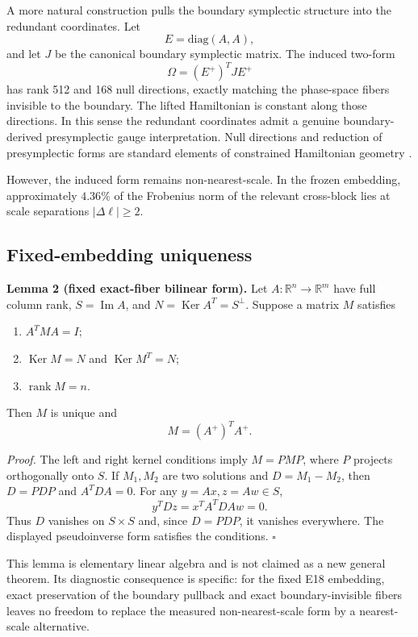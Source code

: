 \documentclass[11pt,a4paper]{article}
\newcommand{\R}{\mathbb{R}}
\newcommand{\rank}{\operatorname{rank}}
\newcommand{\Img}{\operatorname{Im}}
\newcommand{\Ker}{\operatorname{Ker}}
\begin{document}
A more natural construction pulls the boundary symplectic structure into the redundant coordinates. Let
\begin{equation}
E=\mathrm{diag}(A,A),
\end{equation}
and let $J$ be the canonical boundary symplectic matrix. The induced two-form
\begin{equation}
\Omega=(E^+)^T J E^+
\end{equation}
has rank 512 and 168 null directions, exactly matching the phase-space fibers invisible to the boundary. The lifted Hamiltonian is constant along those directions. In this sense the redundant coordinates admit a genuine boundary-derived presymplectic gauge interpretation. Null directions and reduction of presymplectic forms are standard elements of constrained Hamiltonian geometry \cite{gotay1978}.

However, the induced form remains non-nearest-scale. In the frozen embedding, approximately $4.36\%$ of the Frobenius norm of the relevant cross-block lies at scale separations $|\Delta\ell|\ge2$.

\subsection{Fixed-embedding uniqueness}
\textbf{Lemma 2 (fixed exact-fiber bilinear form).}
Let $A:\R^n\to\R^m$ have full column rank, $S=\Img A$, and $N=\Ker A^T=S^\perp$. Suppose a matrix $M$ satisfies
\begin{enumerate}
\item $A^TMA=I$;
\item $\Ker M=N$ and $\Ker M^T=N$;
\item $\rank M=n$.
\end{enumerate}
Then $M$ is unique and
\begin{equation}
M=(A^+)^TA^+.
\end{equation}

\textit{Proof.}
The left and right kernel conditions imply $M=PMP$, where $P$ projects orthogonally onto $S$. If $M_1,M_2$ are two solutions and $D=M_1-M_2$, then $D=PDP$ and $A^TDA=0$. For any $y=Ax,z=Aw\in S$,
\begin{equation}
y^TDz=x^TA^TDAw=0.
\end{equation}
Thus $D$ vanishes on $S\times S$ and, since $D=PDP$, it vanishes everywhere. The displayed pseudoinverse form satisfies the conditions. \hfill$\square$

This lemma is elementary linear algebra and is not claimed as a new general theorem. Its diagnostic consequence is specific: for the fixed E18 embedding, exact preservation of the boundary pullback and exact boundary-invisible fibers leaves no freedom to replace the measured non-nearest-scale form by a nearest-scale alternative.
\end{document}
